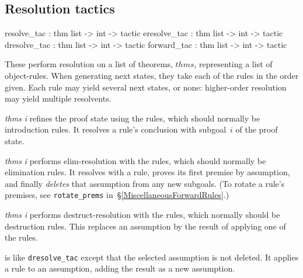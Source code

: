 \subsection{Resolution tactics}
\begin{ttbox} 
resolve_tac  : thm list -> int -> tactic
eresolve_tac : thm list -> int -> tactic
dresolve_tac : thm list -> int -> tactic
forward_tac  : thm list -> int -> tactic 
\end{ttbox}
These perform resolution on a list of theorems, $thms$, representing a list
of object-rules.  When generating next states, they take each of the rules
in the order given.  Each rule may yield several next states, or none:
higher-order resolution may yield multiple resolvents.
\begin{ttdescription}
\item[\ttindexbold{resolve_tac} {\it thms} {\it i}] 
  refines the proof state using the rules, which should normally be
  introduction rules.  It resolves a rule's conclusion with
  subgoal~$i$ of the proof state.

\item[\ttindexbold{eresolve_tac} {\it thms} {\it i}] 
  performs elim-resolution with the rules, which should normally be
  elimination rules.  It resolves with a rule, proves its first premise by
  assumption, and finally \emph{deletes} that assumption from any new
  subgoals.  (To rotate a rule's premises,
  see \texttt{rotate_prems} in~\S\ref{MiscellaneousForwardRules}.)

\item[\ttindexbold{dresolve_tac} {\it thms} {\it i}] 
  performs destruct-resolution with the rules, which normally should
  be destruction rules.  This replaces an assumption by the result of
  applying one of the rules.

\item[\ttindexbold{forward_tac}]
  is like {\tt dresolve_tac} except that the selected assumption is not
  deleted.  It applies a rule to an assumption, adding the result as a new
  assumption.
\end{ttdescription}

